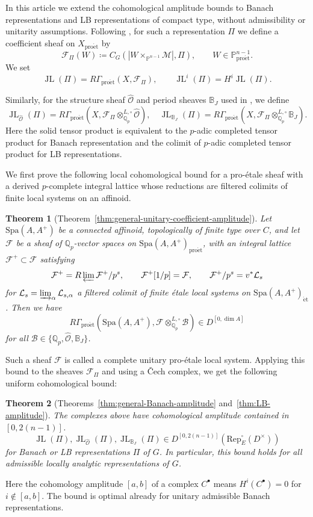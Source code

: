 \documentclass[11pt]{article}
\newtheorem{theorem}{Theorem}[section]
\theoremstyle{definition}
\newcommand{\Qp}{\mathbb Q_p}
\newcommand{\cM}{\mathcal M}
\newcommand{\cF}{\mathcal F}
\newcommand{\cL}{\mathcal L}
\newcommand{\proet}{\mathrm{pro\acute et}}
\newcommand{\et}{\mathrm{\acute et}}
\newcommand{\JL}{\operatorname{JL}}
\begin{document}
In this article we extend the cohomological amplitude bounds
to Banach representations and LB representations of compact
type, without admissibility or unitarity assumptions.  Following
\cite{DRC}, for such a representation $\Pi$ we define a coefficient
sheaf on $X_{\proet}$ by
\[\cF_\Pi(W)\coloneqq C_G(|W\times_{\mathbb{P}^{n-1}}\cM|, \Pi), \qquad W\in\mathbb{P}^{n-1}_{\proet}.\]
We set \[\JL(\Pi)=R\Gamma_{\proet}(X, \cF_\Pi), \qquad \JL^i(\Pi)=H^i\JL(\Pi).\]

Similarly, for the structure sheaf $\widehat{\mathscr O}$ and period sheaves $\mathbb{B}_J$ used in \cite{DRC}, we define 
\[
\JL_{\widehat{\mathscr O}}(\Pi)=R\Gamma_{\proet}(X, \cF_\Pi\otimes_{\Qp}^{L,\square}\widehat{\mathscr O}),\quad
\JL_{\mathbb{B}_J}(\Pi)=R\Gamma_{\proet}(X, \cF_\Pi\otimes_{\Qp}^{L,\square}\mathbb{B}_J).
\]
Here the solid tensor product is equivalent to the $p$-adic completed tensor product for Banach representation and the colimit of $p$-adic completed tensor product for LB representations. 

We first prove the following local cohomological bound for a pro-\'etale sheaf with a derived \(p\)-complete integral lattice whose reductions are filtered colimits of finite local systems on an affinoid.
\begin{theorem}[Theorem~\ref{thm:general-unitary-coefficient-amplitude}]
      Let $\mathrm{Spa}(A, A^+)$ be a connected affinoid, topologically of finite type over $C$, and let $\cF$ be a sheaf of $\Qp$-vector spaces on $\mathrm{Spa}(A, A^+)_{\proet}$, with an integral lattice $\cF^+\subset \cF$ satisfying
      \[\cF^+=R\varprojlim\cF^+/p^s,\qquad \cF^+[1/p]=\cF,\qquad \cF^+/p^s=v^*\cL_s\]
      for $\cL_s=\varinjlim_{\alpha}\cL_{s,\alpha}$ a filtered colimit of finite \'etale local systems on $\mathrm{Spa}(A, A^+)_{\et}$. Then we have
      \[R\Gamma_{\proet}(\mathrm{Spa}(A, A^+), \cF\otimes_{\Qp}^{L,\square}\mathscr{B})\in D^{[0, \dim A]}\] for all $\mathscr{B}\in\{\mathbb{Q}_p, \widehat{\mathscr O}, \mathbb B_J\}$.
\end{theorem}
Such a sheaf $\cF$ is called a complete unitary pro-\'etale local system. 
Applying this bound to the sheaves $\cF_{\Pi}$ and using a \v Cech complex, we get the following uniform cohomological bound:
\begin{theorem}[Theorems~\ref{thm:general-Banach-amplitude} and~\ref{thm:LB-amplitude}]
   The complexes above have cohomological amplitude contained in $[0, 2(n-1)]$. 
  \[\JL(\Pi), \JL_{\widehat{\mathscr O}}(\Pi), \JL_{\mathbb{B}_J}(\Pi)\in D^{[0, 2(n-1)]}(\mathrm{Rep}_E^{\square}(D^\times))\]
  for Banach or LB representations $\Pi$ of $G$. In particular, this bound holds for all admissible locally analytic representations of $G$. 
\end{theorem}
Here the cohomology amplitude $[a, b]$ of a complex $C^\bullet$ means $H^i(C^\bullet)=0$ for $i\notin[a, b]$. 
The bound is optimal already for unitary admissible Banach representations.
\end{document}
